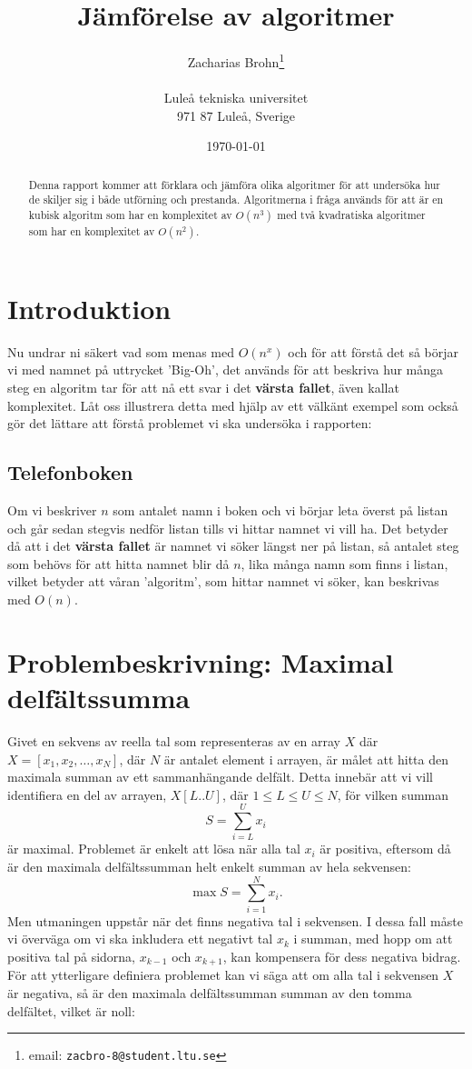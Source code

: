 \documentclass[a4paper,12pt]{article}
\title{Jämförelse av algoritmer}
\author{Zacharias Brohn\thanks{email:
        \texttt{zacbro-8@student.ltu.se}}\\  
        ~ \\
        Luleå tekniska universitet \\ 
        971 87 Luleå, Sverige}
\date{\today}
\begin{document}
\linenumbers %
\maketitle
%
\begin{abstract}
  Denna rapport kommer att förklara och jämföra olika algoritmer för att undersöka hur de skiljer sig i både utförning och prestanda. Algoritmerna i fråga används för att  är en kubisk algoritm som har en komplexitet av $O(n^3)$ med två kvadratiska algoritmer som har en komplexitet av $O(n^2)$.
\end{abstract}
%
\section{Introduktion}
\label{sec:introduktion}
  Nu undrar ni säkert vad som menas med $O(n^x)$ och för att förstå det så börjar vi med namnet på uttrycket 'Big-Oh', det används för att beskriva hur många steg en algoritm tar för att nå ett svar i det \textbf{värsta fallet}, även kallat komplexitet. Låt oss illustrera detta med hjälp av ett välkänt exempel som också gör det lättare att förstå problemet vi ska undersöka i rapporten:
  \subsection*{Telefonboken}
    Om vi beskriver $n$ som antalet namn i boken och vi börjar leta överst på listan och går sedan stegvis nedför listan tills vi hittar namnet vi vill ha. Det betyder då att i det \textbf{värsta fallet} är namnet vi söker längst ner på listan, så antalet steg som behövs för att hitta namnet blir då $n$, lika många namn som finns i listan, vilket betyder att våran 'algoritm', som hittar namnet vi söker, kan beskrivas med $O(n)$.

\newpage
\section{Problembeskrivning: Maximal delfältssumma}
\label{sec:problembeskrivning}
Givet en sekvens av reella tal som representeras av en array $X$ där $X = [x_1, x_2, \ldots, x_N]$, där $N$ är antalet element i arrayen, är målet att hitta den maximala summan av ett sammanhängande delfält. Detta innebär att vi vill identifiera en del av arrayen, $X[L..U]$, där $1 \leq L \leq U \leq N$, för vilken summan
\begin{displaymath}
S = \sum_{i=L}^{U} x_i
\end{displaymath}
är maximal. Problemet är enkelt att lösa när alla tal $x_i$ är positiva, eftersom då är den maximala delfältssumman helt enkelt summan av hela sekvensen:
\begin{displaymath}
\max S = \sum_{i=1}^{N} x_i.
\end{displaymath}
Men utmaningen uppstår när det finns negativa tal i sekvensen. I dessa fall måste vi överväga om vi ska inkludera ett negativt tal $x_k$ i summan, med hopp om att positiva tal på sidorna, $x_{k-1}$ och $x_{k+1}$, kan kompensera för dess negativa bidrag.
För att ytterligare definiera problemet kan vi säga att om alla tal i sekvensen $X$ är negativa, så är den maximala delfältssumman summan av den tomma delfältet, vilket är noll:
\end{document}

